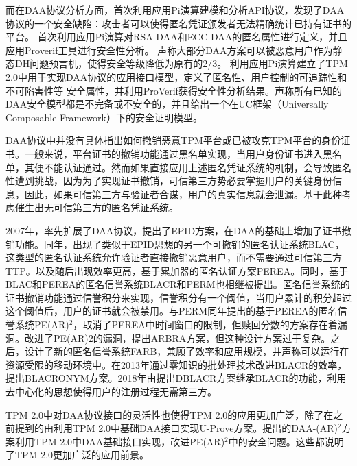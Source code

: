 而在DAA协议分析方面，\citet{backes2008zero}首次利用应用Pi演算建模和分析API协议，发现了DAA协议的一个安全缺陷：攻击者可以使得匿名凭证颁发者无法精确统计已持有证书的平台。 \citet{smyth2011formal,Smyth2015Formal}首次利用应用Pi演算对RSA-DAA和ECC-DAA的匿名属性进行定义，并且应用Proverif工具进行安全性分析。 \citet{Brickell2012A}声称大部分DAA方案可以被恶意用户作为静态DH问题预言机，使得安全等级降低为原有的2/3。 \citet{xi2014formal}利用应用Pi演算建立了TPM 2.0中用于实现DAA协议的应用接口模型，定义了匿名性、用户控制的可追踪性和不可陷害性等 安全属性，并利用ProVerif获得安全性分析结果。\citet{Camenisch2016Universally}声称所有已知的DAA安全模型都是不完备或不安全的，并且给出一个在UC框架（Universally Composable Framework）下的安全证明模型。


DAA协议中并没有具体指出如何撤销恶意TPM平台或已被攻克TPM平台的身份证书。一般来说，平台证书的撤销功能通过黑名单实现，当用户身份证书进入黑名单，其便不能认证通过。然而如果直接应用上述匿名凭证系统的机制，会导致匿名性遭到挑战，因为为了实现证书撤销，可信第三方势必要掌握用户的关键身份信息，因此，如果可信第三方与验证者合谋，用户的真实信息就会泄漏。基于此种考虑催生出无可信第三方的匿名凭证系统。

2007年，\citet{brickell2007enhanced}率先扩展了DAA协议，提出了EPID方案，在DAA的基础上增加了证书撤销功能。同年，出现了类似于EPID思想的另一个可撤销的匿名认证系统BLAC\citep{tsang2007blacklistable}，这类型的匿名认证系统允许验证者直接撤销恶意用户，而不需要通过可信第三方TTP。以及随后出现效率更高，基于累加器的匿名认证方案PEREA\citep{tsang2008perea}。同时，基于BLAC和PEREA的匿名信誉系统BLACR\citep{au2012blacr}和PERM\citep{au2012perm}也相继被提出。匿名信誉系统的证书撤销功能通过信誉积分来实现，信誉积分有一个阈值，当用户累计的积分超过这个阈值后，用户的证书就会被禁用。与PERM同年提出的基于PEREA的匿名信誉系统PE(AR)$^2$\citep{yu2012pe}，取消了PEREA中时间窗口的限制，但赎回分数的方案存在着漏洞。\citet{xi2014arbra}改进了PE(AR)2的漏洞，提出ARBRA方案，但这种设计方案过于复杂。之后，\citet{xi2014farb}设计了新的匿名信誉系统FARB\citep{xi2014farb}，兼顾了效率和应用规模，并声称可以运行在资源受限的移动环境中。\citet{henry2013thinking}在2013年通过零知识的批处理技术改进BLACR的效率，提出BLACRONYM方案。2018年由\citet{YangDecentralized}提出DBLACR方案继承BLACR的功能，利用去中心化的思想使得用户的注册过程无需第三方。

TPM 2.0中对DAA协议接口的灵活性也使得TPM 2.0的应用更加广泛，除了在之前提到的由\citet{chen2013flexible}利用TPM 2.0中基础DAA接口实现U-Prove方案。\citet{邵健雄2016下一代可信计算协议的设计与分析}提出的DAA-(AR)$^2$方案利用TPM 2.0中DAA基础接口实现，改进PE(AR)$^2$中的安全问题。这些都说明了TPM 2.0更加广泛的应用前景。

